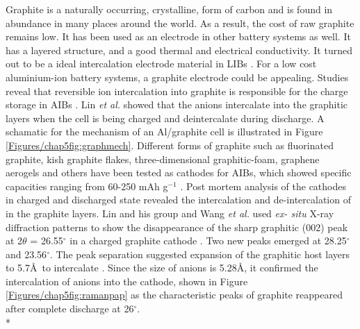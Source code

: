 Graphite is a naturally occurring, crystalline, form of carbon and is found in abundance in many places around the world. As a result, the cost of raw graphite remains low. It has been used as an electrode in other battery systems as well. It has a layered structure, and a good thermal and electrical conductivity. It turned out to be a ideal intercalation electrode material in LIBs \cite{ji_recent_2011, yoo_large_2008, lian_large_2010}. For a low cost aluminium-ion battery systems, a graphite electrode could be appealing. Studies reveal that reversible ion intercalation into graphite is responsible for the charge storage in AIBs \cite{rani_fluorinated_2013, lin_ultrafast_2015}. Lin \textit{et al.} showed that the  anions intercalate into the graphitic layers when the cell is being charged and deintercalate during discharge. A schamatic for the mechanism of an Al/graphite cell is illustrated in Figure \ref{Figures/chap5fig:graphmech}. Different forms of graphite such as fluorinated graphite, kish graphite flakes, three-dimensional graphitic-foam, graphene aerogels and others have been tested as cathodes for AIBs, which showed specific capacities ranging from 60-250 mAh g$^{-1}$ \cite{rani_fluorinated_2013, wang_kish_2017, wu_3d_2016, huang_graphene_2019}. Post mortem analysis of the cathodes in charged and discharged state revealed the intercalation and de-intercalation of  in the graphite layers. Lin and his group and Wang \textit{et al.} used \textit{ex- situ} X-ray diffraction patterns to show the disappearance of the sharp graphitic (002) peak at 2$\theta$ = 26.55$^{\circ}$ in a charged graphite cathode \cite{lin_ultrafast_2015, wang_kish_2017}. Two new peaks emerged at 28.25$^{\circ}$ and 23.56$^{\circ}$. The peak separation suggested expansion of the graphitic host layers to 5.7\AA\ to intercalate . Since the size of  anions is 5.28\AA, it confirmed the intercalation of  anions into the cathode, shown in Figure \ref{Figures/chap5fig:ramanpap} as the characteristic peaks of graphite reappeared after complete discharge at 26$^{\circ}$. \\*

